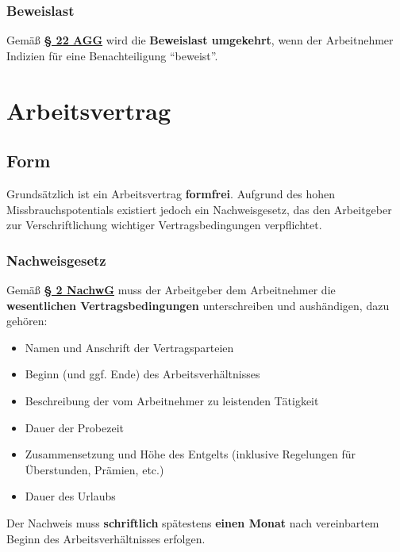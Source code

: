 \documentclass[12pt,A4]{extarticle}
\newcommand{\highlight}[1]{\textcolor{highlightColor}{\textbf{#1}}}
\newcommand{\agG}[2][]{\textbf{\textcolor{gesetzLink}{\href{https://www.gesetze-im-internet.de/agg/__#2.html}{§ #2 \ifthenelse{\equal{#1}{}}{}{#1 }AGG}}}}
\newcommand{\nachwG}[2][]{\textbf{\textcolor{gesetzLink}{\href{https://www.gesetze-im-internet.de/nachwg/__#2.html}{§ #2 \ifthenelse{\equal{#1}{}}{}{#1 }NachwG}}}}
\begin{document}
\subsubsection{Beweislast}
Gemäß \agG{22} wird die \textbf{Beweislast umgekehrt}, wenn der Arbeitnehmer Indizien für eine Benachteiligung ``beweist''.

\section{Arbeitsvertrag}
\subsection{Form}
Grundsätzlich ist ein Arbeitsvertrag \highlight{formfrei}. Aufgrund des hohen Missbrauchspotentials existiert jedoch ein Nachweisgesetz, das den Arbeitgeber zur Verschriftlichung wichtiger Vertragsbedingungen verpflichtet.

\subsubsection{Nachweisgesetz}
Gemäß \nachwG{2} muss der Arbeitgeber dem Arbeitnehmer die \textbf{wesentlichen Vertragsbedingungen} unterschreiben und aushändigen, dazu gehören:
\begin{itemize}
  \item{Namen und Anschrift der Vertragsparteien}
  \item{Beginn (und ggf. Ende) des Arbeitsverhältnisses}
  \item{Beschreibung der vom Arbeitnehmer zu leistenden Tätigkeit}
  \item{Dauer der Probezeit}
  \item{Zusammensetzung und Höhe des Entgelts (inklusive Regelungen für Überstunden, Prämien, etc.)}
  \item{Dauer des Urlaubs}
\end{itemize}
Der Nachweis muss \textbf{schriftlich} spätestens \textbf{einen Monat} nach vereinbartem Beginn des Arbeitsverhältnisses erfolgen.
\end{document}
